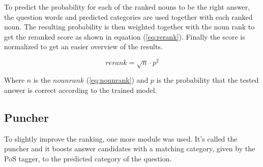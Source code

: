 To predict the probability for each of the ranked nouns to be the right answer, the question words and predicted categories
are used together with each ranked noun. The resulting probability is then weighted together with the noun rank to get the
reranked score as shown in equation (\ref{eq:rerank}). Finally the score is normalized to get an easier overview of the results.

\begin{equation}
rerank = \sqrt{n} \cdot p^2
\label{eq:rerank}
\end{equation}

Where $n$ is the $nounrank$ (\ref{eq:nounrank}) and $p$ is the probability that the tested answer is correct according 
to the trained model.

\subsection{Puncher}

To slightly improve the ranking, one more module was used. It's called the puncher and it boosts 
answer candidates with a matching category, given by the PoS tagger, to the predicted category of the question. 
